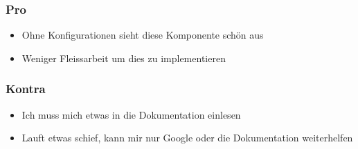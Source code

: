 \subsubsection{Pro}
\begin{itemize}
  \item Ohne Konfigurationen sieht diese Komponente schön aus
  \item Weniger Fleissarbeit um dies zu implementieren
\end{itemize}
\subsubsection{Kontra}
\begin{itemize}
  \item Ich muss mich etwas in die Dokumentation einlesen
  \item Lauft etwas schief, kann mir nur Google oder die Dokumentation weiterhelfen
\end{itemize}